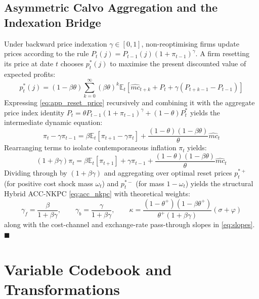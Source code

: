 \documentclass[review,12pt]{elsarticle}
\begin{document}
\subsection{Asymmetric Calvo Aggregation and the Indexation Bridge}
Under backward price indexation $\gamma \in [0,1]$, non-reoptimising firms update prices according to the rule $P_t(j) = P_{t-1}(j)(1+\pi_{t-1})^\gamma$. A firm resetting its price at date $t$ chooses $p_t^*(j)$ to maximise the present discounted value of expected profits:
\begin{equation}
p_t^*(j) = (1-\beta\theta) \sum_{k=0}^{\infty} (\beta\theta)^k \mathbb{E}_t \left[ \widehat{mc}_{t+k} + P_t + \gamma (P_{t+k-1} - P_{t-1}) \right]
\label{eq:app_reset_price}
\end{equation}
Expressing \eqref{eq:app_reset_price} recursively and combining it with the aggregate price index identity $P_t = \theta P_{t-1}(1+\pi_{t-1})^\gamma + (1-\theta) P_t^*$ yields the intermediate dynamic equation:
\begin{equation}
\pi_t - \gamma \pi_{t-1} = \beta \mathbb{E}_t [\pi_{t+1} - \gamma \pi_t] + \frac{(1-\theta)(1-\beta\theta)}{\theta} \widehat{mc}_t
\end{equation}
Rearranging terms to isolate contemporaneous inflation $\pi_t$ yields:
\begin{equation}
(1 + \beta\gamma) \pi_t = \beta \mathbb{E}_t[\pi_{t+1}] + \gamma \pi_{t-1} + \frac{(1-\theta)(1-\beta\theta)}{\theta} \widehat{mc}_t
\end{equation}
Dividing through by $(1 + \beta\gamma)$ and aggregating over optimal reset prices $p_t^{*+}$ (for positive cost shock mass $\omega_t$) and $p_t^{*-}$ (for mass $1-\omega_t$) yields the structural Hybrid ACC-NKPC \eqref{eq:acc_nkpc} with theoretical weights:
\begin{equation}
\gamma_f = \frac{\beta}{1+\beta\gamma}, \qquad \gamma_b = \frac{\gamma}{1+\beta\gamma}, \qquad \kappa = \frac{(1-\theta^+)(1-\beta\theta^+)}{\theta^+(1+\beta\gamma)}(\sigma+\varphi)
\end{equation}
along with the cost-channel and exchange-rate pass-through slopes in \eqref{eq:slopes}. $\blacksquare$

\clearpage
\section{Variable Codebook and Transformations}
\label{app:data}
\end{document}
